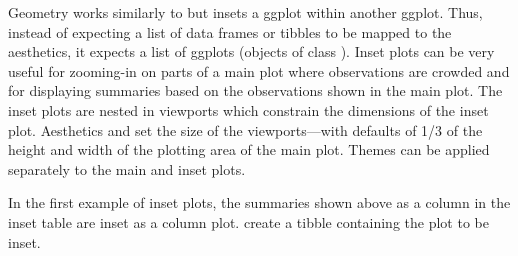\documentclass[krantz2]{krantz}\usepackage{knitr}
\begin{document}
Geometry  works similarly to  but insets a ggplot within another ggplot. Thus, instead of expecting a list of data frames or tibbles to be mapped to the  aesthetics, it expects a list of ggplots (objects of class ). Inset plots can be very useful for zooming-in on parts of a main plot where observations are crowded and for displaying summaries based on the observations shown in the main plot. The inset plots are nested in viewports which constrain the dimensions of the inset plot. Aesthetics  and  set the size of the viewports---with defaults of 1/3 of the height and width of the plotting area of the main plot. Themes can be applied separately to the main and inset plots.

In the first example of inset plots, the summaries shown above as a column in the inset table are inset as a column plot.  create a tibble containing the plot to be inset.

\begin{knitrout}\footnotesize
{}\color{fgcolor}\begin{kframe}
\begin{alltt}
  \hlstd{(} \hlstd{=} 
  \hlstd{(} \hlstd{= _,}
          \hlstd{=} \hlstd{(}  \hlstd{=}  \hlopt{+}
  \hlstd{(} \hlstd{=} \hlstd{)} \hlopt{+}
  \hlstd{(} \hlstd{=} \hlstd{)} \hlopt{+}
    \hlstd{()} \hlopt{+}
    \hlstd{(}\hlstd{)} \hlkwb{->} 
 \hlkwb{<-} \hlstd{(} \hlstd{=} \hlstd{,}  \hlstd{=} \hlstd{,}  \hlstd{=} 
\end{alltt}
\end{kframe}
\end{knitrout}
\end{document}

